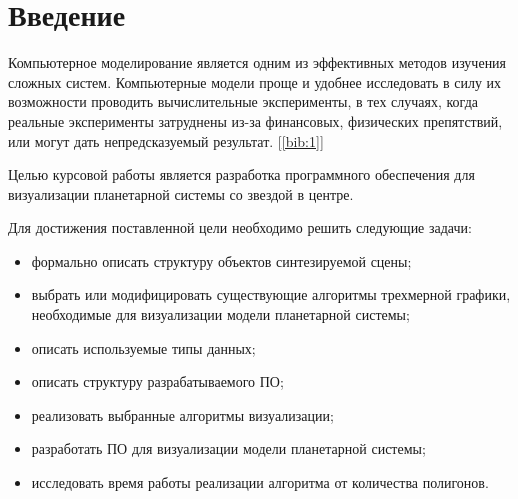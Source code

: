 \section*{\large Введение}

\par Компьютерное моделирование является одним из эффективных методов изучения сложных систем. Компьютерные модели проще и удобнее исследовать в силу их возможности проводить вычислительные эксперименты, в тех случаях, когда реальные эксперименты затруднены из-за финансовых, физических препятствий, или могут дать непредсказуемый результат. [\ref{bib:1}]
\par Целью курсовой работы является разработка программного обеспечения для визуализации планетарной системы со звездой в центре.
\par Для достижения поставленной цели необходимо решить следующие задачи:
\begin{itemize}
	\item формально описать структуру объектов синтезируемой сцены;
\item выбрать или модифицировать существующие алгоритмы трехмерной графики, необходимые для визуализации модели планетарной системы;
\item описать используемые типы данных;
\item описать структуру разрабатываемого ПО;
\item реализовать выбранные алгоритмы визуализации;
\item разработать ПО для визуализации модели планетарной системы;
\item исследовать время работы реализации алгоритма от количества полигонов.
\end{itemize}
\newpage